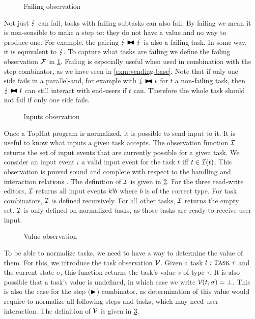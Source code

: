 \begin{figure}
  \OFailing
  \caption{Failing observation}
  \label{fig:observation-failing}
\end{figure}

Not just $\lightning$ can fail, tasks with failing subtasks can also fail.
By failing we mean it is non-sensible to make a step to:
they do not have a value and no way to produce one.
For example, the pairing $\lightning \blacktriangleright\mkern-8mu\blacktriangleleft \lightning$ is also a failing task.
In some way, it is equivalent to $\lightning$.
To capture what tasks are failing we define the failing observation $\mathcal{F}$ in \cref{fig:observation-failing}.
Failing is especially useful when used in combination with the step combinator,
as we have seen in \cref{exm:vending-base}.
Note that if only one side fails in a parallel-and,
for example with $\lightning \blacktriangleright\mkern-8mu\blacktriangleleft t$ for $t$ a non-failing task,
then $\lightning \blacktriangleright\mkern-8mu\blacktriangleleft t$ can still interact with end-users if $t$ can.
Therefore the whole task should not fail if only one side fails.

\begin{figure}
  \OInputs
  \caption{Inputs observation}
  \label{fig:observation-inputs}
\end{figure}

Once a TopHat program is normalized, it is possible to send input to it.
It is useful to know what inputs a given task accepts.
The observation function $\mathcal{I}$ returns the set of input events that are currently possible for a given task.
We consider an input event $\iota$ a valid input event for the task $t$ iff $t \in \mathcal{I}(t)$.
This observation is proved sound and complete with respect to the handling and interaction relations \cite{Steenvoorden22}.
The definition of $\mathcal{I}$ is given in \cref{fig:observation-inputs}.
For the three read-write editors, $\mathcal{I}$ returns all input events $k ! b$ where $b$ is of the correct type.
For task combinators, $\mathcal{I}$ is defined recursively.
For all other tasks, $\mathcal{I}$ returns the empty set.
$\mathcal{I}$ is only defined on normalized tasks, as those tasks are ready to receive user input.

\begin{figure}
  \OValue
  \caption{Value observation}
  \label{fig:observation-value}
\end{figure}

To be able to normalize tasks, we need to have a way to determine the value of them.
For this, we introduce the task observation $\mathcal{V}$.
Given a task $t:{\text{\normalfont\sffamily\scshape Task}}\;\tau$ and the current state $\sigma$,
this function returns the task's value $v$ of type $\tau$.
It is also possible that a task's value is undefined, in which case we write $\mathcal{V}(t,\sigma) = \bot$.
This is also the case for the step ($\blacktriangleright$) combinator,
as determination of this value would require to normalize all following steps and tasks,
which may need user interaction.
The definition of $\mathcal{V}$ is given in \cref{fig:observation-value}.
